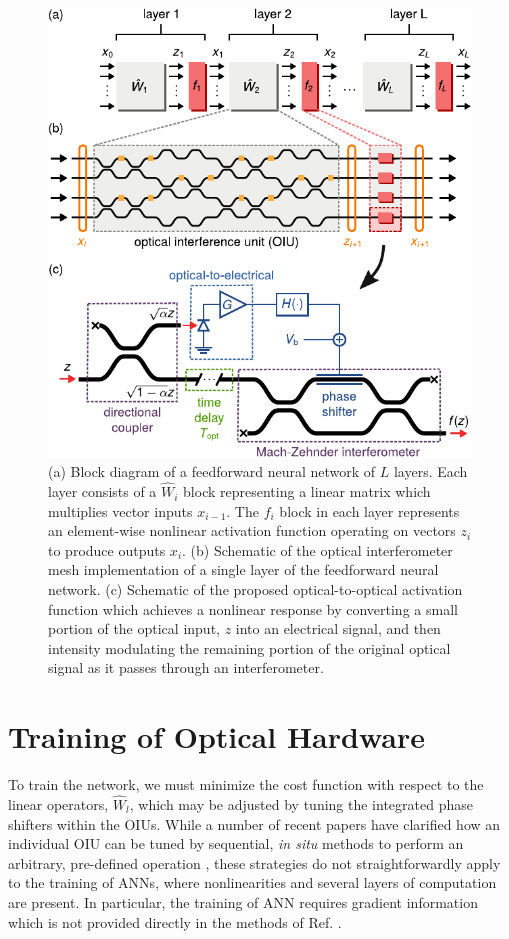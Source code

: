 \begin{figure}
  \centering
  \includegraphics{figures/insitu_activation}
  \caption{(a) Block diagram of a feedforward neural network of $L$ layers. 
  Each layer consists of a $\hat{W}_i$ block representing a linear matrix which multiplies vector inputs $x_{i-1}$. 
  The $f_i$ block in each layer represents an element-wise nonlinear activation function operating on vectors $z_i$ to produce outputs $x_{i}$.
  (b) Schematic of the optical interferometer mesh implementation of a single layer of the feedforward neural network. 
  (c) Schematic of the proposed optical-to-optical activation function which achieves a nonlinear response by converting a small portion of the optical input, $z$ into an electrical signal, and then intensity modulating the remaining portion of the original optical signal as it passes through an interferometer.}
  \label{fig:overview}
\end{figure}

\section{Training of Optical Hardware}

To train the network, we must minimize the cost function with respect to the linear operators, $\hat{W}_l$, which may be adjusted by tuning the integrated phase shifters within the OIUs.  While a number of recent papers have clarified how an individual OIU can be tuned by sequential,  \textit{in situ} methods to perform an arbitrary, pre-defined operation \cite{Miller2013, Miller2013a, Miller2015, Annoni2017}, these strategies do not straightforwardly apply to the training of ANNs, where nonlinearities and several layers of computation are present.  In particular, the training of ANN requires gradient information which is not provided directly in the methods of Ref. \cite{Miller2013, Miller2013a, Miller2015, Annoni2017}.

